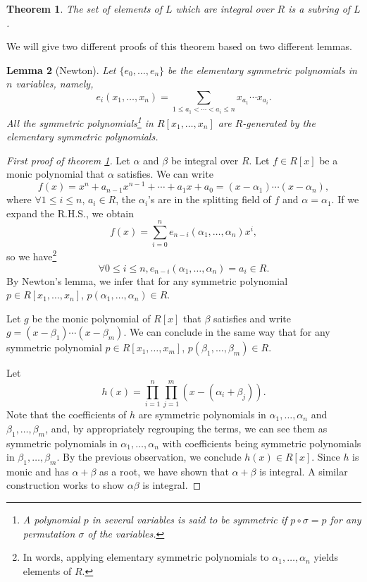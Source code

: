 \documentclass{tufte-handout} %
\newtheorem{thm}{Theorem}
\newtheorem{lem}[thm]{Lemma}
\theoremstyle{definition}
\theoremstyle{remark}
\begin{document}
\begin{thm}\label{intsubring}
	The set of elements of $L$ which are integral over $R$ is a subring of $L$.
\end{thm}
We will give two different proofs of this theorem based on two different lemmas.
\begin{lem}[Newton]
	Let $\{e_0, \dots, e_n\}$ be the elementary symmetric polynomials in $n$ variables, namely,
	\[e_i(x_1, \dots, x_n) = \sum_{1 \leq a_1 < \cdots < a_i \leq n} x_{a_1}\cdots x_{a_i}.\]
	All the symmetric polynomials\footnote{A polynomial $p$ in several variables is said to be symmetric if $p \circ \sigma = p$ for any permutation $\sigma$ of the variables.} in $R[x_1, \dots, x_n]$ are $R$-generated by the elementary symmetric polynomials.
\end{lem}
\begin{proof}[First proof of theorem \ref{intsubring}]
	Let $\alpha$ and $\beta$ be integral over $R$. Let $f \in R[x]$ be a monic polynomial that $\alpha$ satisfies. We can write \[f(x) = x^n+a_{n-1}x^{n-1}+\cdots + a_1x+a_0 =  (x-\alpha_1)\cdots (x-\alpha_n),\] where $\forall 1\leq i\leq n$, $a_i \in R$, the $\alpha_i$'s are in the splitting field of $f$ and $\alpha = \alpha_1$. If we expand the R.H.S., we obtain
	\[f(x) = \sum_{i=0}^n e_{n-i}(\alpha_1, \dots, \alpha_n)x^i,\] so we have\footnote{In words, applying elementary symmetric polynomials to $\alpha_1, \dots, \alpha_n$ yields elements of $R$.} 
	\[\forall 0 \leq i \leq n, e_{n-i}(\alpha_1, \dots, \alpha_n) = a_i \in R.\]
	By Newton's lemma, we infer that for any symmetric polynomial $p \in R[x_1, \dots, x_n]$, $p(\alpha_1, \dots, \alpha_n) \in R$.
	
	Let $g$ be the monic polynomial of $R[x]$ that $\beta$ satisfies and write $g = (x-\beta_1)\cdots(x-\beta_m)$. We can conclude in the same way that for any symmetric polynomial $p \in R[x_1, \dots, x_m]$, $p(\beta_1, \dots, \beta_m) \in R$.
	
	Let \[h(x) = \prod_{i=1}^n\prod_{j=1}^m (x-(\alpha_i + \beta_j)).\]
	Note that the coefficients of $h$ are symmetric polynomials in $\alpha_1,\dots,\alpha_n$ and $\beta_1,\dots, \beta_m$, and, by appropriately regrouping the terms, we can see them as symmetric polynomials in $\alpha_1, \dots, \alpha_n$ with coefficients being symmetric polynomials in $\beta_1, \dots, \beta_m$. %
	By the previous observation, we conclude $h(x) \in R[x]$. Since $h$ is monic and has $\alpha + \beta$ as a root, we have shown that $\alpha+\beta$ is integral. A similar construction works to show $\alpha\beta$ is integral.
\end{proof}
\end{document}
